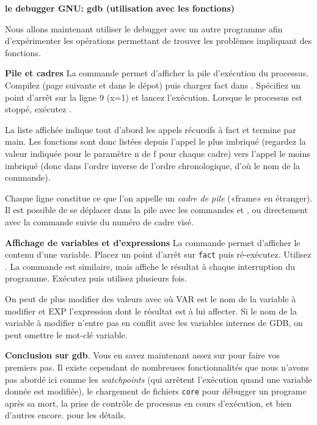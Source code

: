 \documentclass[10pt]{article}\usepackage[nu]{esial}
\begin{document}
\begin{Exercice}\textbf{le debugger GNU: gdb (utilisation avec les fonctions)}

  Nous allons maintenant utiliser le debugger avec un autre programme afin
  d'expérimenter les opérations permettant de trouver les problèmes impliquant
  des fonctions.

  \textbf{Pile et cadres} La commande  permet d'afficher la pile
  d'exécution du processus. Compilez  (page suivante et dans le
  dépot) puis chargez fact dans . Spécifiez un point d'arrêt sur la
  ligne 9 (x=1) et lancez l'exécution. Lorsque le processus est stoppé,
  exécutez .

  La liste affichée indique tout d'abord les appels récursifs à fact et
  termine par main. Les fonctions sont donc listées depuis l'appel le plus
  imbriqué (regardez la valeur indiquée pour le paramètre n de f pour chaque
  cadre) vers l'appel le moins imbriqué (donc dans l'ordre inverse de l'ordre
  chronologique, d'où le nom de la commande).

  Chaque ligne constitue ce que l'on appelle un \textit{cadre de pile} («frame»
  en étranger). Il est possible de se déplacer dans la pile avec les commandes
   et , ou directement avec la commande  suivie du
  numéro de cadre visé.

  \noindent\begin{minipage}{.67\linewidth}
    \medskip \textbf{Affichage de variables et d'expressions} La commande
     permet d'afficher le contenu d'une variable. Placez un point
    d'arrêt sur \texttt{fact} puis ré-exécutez. Utilisez . La
    commande  est similaire, mais affiche le résultat à chaque
    interruption du programme. Exécutez  puis utilisez
     plusieurs fois.
   
    \I On peut de plus modifier des valeurs avec  où
    VAR est le nom de la variable à modifier et EXP l'expression dont le
    résultat est à lui affecter. Si le nom de la variable à modifier n'entre
    pas en conflit avec les variables internes de GDB, on peut omettre le
    mot-clé variable.

  \medskip
  \noindent\textbf{Conclusion sur gdb}. Vous en savez maintenant assez
  sur  pour faire vos premiers pas. Il existe cependant de nombreuses
  fonctionnalités que nous n'avons pas abordé ici comme les \textit{watchpoints}
  (qui arrêtent l'exécution quand une variable donnée est modifiée), le
  chargement de fichiers \texttt{core} pour débugger un programe après sa mort,
  la prise de contrôle de processus en cours d'exécution, et bien d'autres
  encore.  pour les détails.
  \end{minipage}\hfill\begin{minipage}{.32\linewidth}
  \end{minipage}


\end{Exercice}
\end{document}
